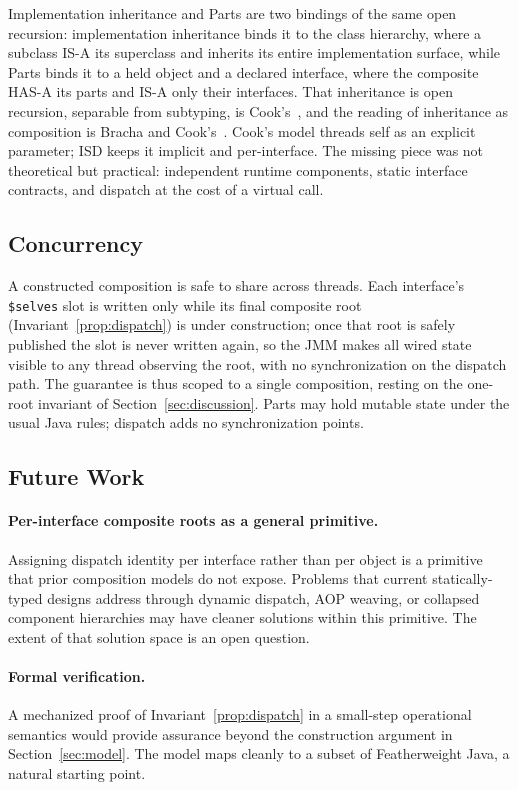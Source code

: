 \documentclass[acmsmall,nonacm]{acmart}
\theoremstyle{acmplain}
\theoremstyle{acmdefinition}
\newcommand{\code}[1]{\texttt{#1}}
\begin{document}
Implementation inheritance and Parts are two bindings of the same open
recursion: implementation inheritance binds it to the class hierarchy, where a
subclass IS-A its superclass and inherits its entire implementation surface,
while Parts binds it to a held object and a declared interface, where the
composite HAS-A its parts and IS-A only their interfaces. That inheritance
is open recursion, separable from subtyping, is
Cook's~\cite{cookpalsberg1989,cook1990}, and the reading of inheritance as
composition is Bracha and Cook's~\cite{bracha1990}. Cook's model threads self as
an explicit parameter; ISD keeps it implicit and per-interface. The missing piece
was not theoretical but practical: independent runtime components, static interface
contracts, and dispatch at the cost of a virtual call.

\subsection{Concurrency}

A constructed composition is safe to share across threads. Each interface's
\code{\$selves} slot is written only while its final composite root
(Invariant~\ref{prop:dispatch}) is under construction; once that root is safely
published the slot is never written again, so the JMM makes all wired state
visible to any thread observing the root, with no synchronization on the dispatch
path. The guarantee is thus scoped to a single composition, resting on the
one-root invariant of Section~\ref{sec:discussion}. Parts may hold mutable
state under the usual Java rules; dispatch adds no synchronization points.

\subsection{Future Work}
\label{sec:futurework}

\paragraph{Per-interface composite roots as a general primitive.}
Assigning dispatch identity per interface rather than per object is a primitive
that prior composition models do not expose. Problems that current statically-typed designs address through dynamic dispatch, AOP weaving, or collapsed component hierarchies may have cleaner solutions within this primitive. The extent of that solution space is an open question.

\paragraph{Formal verification.}
A mechanized proof of Invariant~\ref{prop:dispatch} in a small-step operational
semantics would provide assurance beyond the construction argument in Section~\ref{sec:model}. The
model maps cleanly to a subset of Featherweight Java, a natural starting point.
\end{document}
